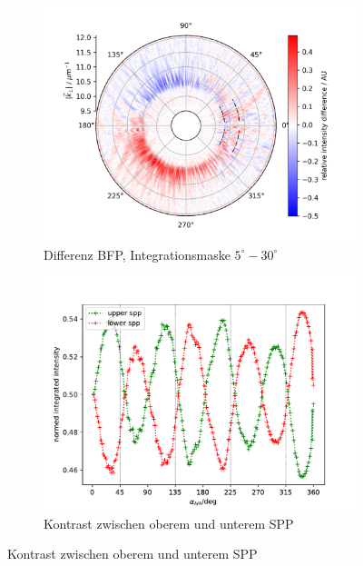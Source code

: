 \documentclass[titlepage]{article}
\begin{document}
\begin{figure}
		\begin{subfigure}[b]{0.5\textwidth}
			\centering
			\includegraphics[width=\textwidth]{figures/spin_hall/diff_forw.png}
			\caption{Differenz BFP, Integrationsmaske $5^\circ-30^\circ$}
			\label{fig:diff_front}
		\end{subfigure}
		\hfill
		\begin{subfigure}[b]{0.49\textwidth}
			\centering
			\includegraphics[width=\textwidth]{figures/spin_hall/intensity_forw.pdf}
			\caption{Kontrast zwischen oberem und unterem SPP}
			\label{fig:intensity_front}
		\end{subfigure}

\end{figure}
\end{document}

